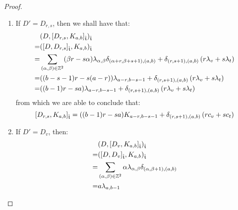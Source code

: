 \begin{proof}
\begin{enumerate}
\begin{enumerate}
                        \item If $D' = D_{r, s}$, then we shall have that:
                            $$
                                \begin{aligned}
                                    & ( D, [D_{r, s}, K_{a, b}]_{\hat{\mathfrak{t}}} )_{\hat{\mathfrak{t}}}
                                    \\
                                    = & ( [D, D_{r, s}]_{\hat{\mathfrak{t}}}, K_{a, b} )_{\hat{\mathfrak{t}}}
                                    \\
                                    = & \sum_{(\alpha, \beta) \in \mathbb{Z}^2} (\beta r - s \alpha) \lambda_{\alpha, \beta} \delta_{(\alpha + r, \beta + s + 1), (a, b)} + \delta_{(r, s + 1), (a, b)} \left( r\lambda_v + s\lambda_t \right)
                                    \\
                                    = & ((b - s - 1) r - s (a - r)) \lambda_{a - r, b - s - 1} + \delta_{(r, s + 1), (a, b)} \left( r\lambda_v + s\lambda_t \right)
                                    \\
                                    = & ((b - 1)r - sa) \lambda_{a - r, b - s - 1} + \delta_{(r, s + 1), (a, b)} \left( r\lambda_v + s\lambda_t \right)
                                \end{aligned}
                            $$
                        from which we are able to conclude that:
                            $$[D_{r, s}, K_{a, b}]_{\hat{\mathfrak{t}}} = ((b - 1)r - sa) K_{a - r, b - s - 1} + \delta_{(r, s + 1), (a, b)} \left( r c_v + s c_t \right)$$
                        \item If $D' = D_v$, then:
                            $$
                                \begin{aligned}
                                    & ( D, [D_v, K_{a, b}]_{\hat{\mathfrak{t}}} )_{\hat{\mathfrak{t}}}
                                    \\
                                    = & ( [D, D_v]_{\hat{\mathfrak{t}}}, K_{a, b} )_{\hat{\mathfrak{t}}}
                                    \\
                                    = & \sum_{(\alpha, \beta) \in \mathbb{Z}^2} \alpha \lambda_{\alpha, \beta} \delta_{(\alpha, \beta + 1), (a, b)} 
                                    \\
                                    = & a \lambda_{a, b - 1}
                                \end{aligned}
$$
\end{enumerate}
\end{enumerate}
\end{proof}
